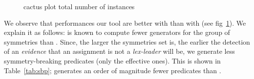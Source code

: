 \begin{figure}[!htbp]
	\centering
	\qquad
	\caption{cactus plot  total number of instances}%
	\label{fig:cactus}%
\end{figure}

We observe that performances our tool are better with \bliss{} than with
\saucy{} (see fig~\ref{fig:cactus}). We explain it as follows: \saucy{} is
known to compute fewer generators for the group of symmetries than \bliss{}.
Since, the larger the symmetries set is, the earlier the detection of an
\emph{evidence} that an assignment is not a \textit{lex-leader} will be, we
generate less symmetry-breaking predicates (only the effective ones). This is
shown in Table~\ref{tab:sbp}; \cdclsym{} generates an order of magnitude fewer
predicates than \breakid{}.


